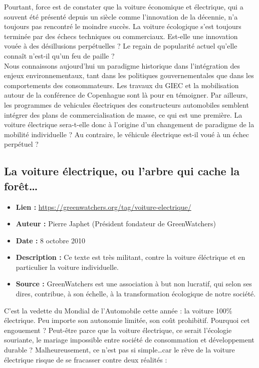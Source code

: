 \documentclass[8pt]{article}
\begin{document}
Pourtant, force est de constater que la voiture économique et électrique, qui a souvent été présenté depuis un siècle comme l’innovation de la décennie, n’a toujours pas rencontré le moindre succès. La voiture écologique s’est toujours terminée par des échecs techniques ou commerciaux. Est-elle une innovation vouée à des désillusions perpétuelles ? Le regain de popularité actuel qu’elle connaît n’est-il qu’un feu de paille ?\\

Nous connaissons aujourd’hui un paradigme historique dans l’intégration des enjeux environnementaux, tant dans les politiques gouvernementales que dans les comportements des consommateurs. Les travaux du GIEC et la mobilisation autour de la conférence de Copenhague sont là pour en témoigner. Par ailleurs, les programmes de vehicules électriques des constructeurs automobiles semblent intégrer des plans de commercialisation de masse, ce qui est une première. La voiture électrique sera-t-elle donc à l’origine d’un changement de paradigme de la mobilité individuelle ? Au contraire, le véhicule électrique est-il voué à un échec perpétuel ?
\newpage

\subsection{La voiture électrique, ou l’arbre qui cache la forêt…}
\begin{itemize}
	\item \textbf{Lien : }  \url{https://greenwatchers.org/tag/voiture-electrique/} 
	\item \textbf{Auteur : } Pierre Japhet (Président fondateur de GreenWatchers)
	\item \textbf{Date : } 8 octobre 2010
	\item \textbf{Description : } Ce texte est très militant, contre la voiture éléctrique et en particulier la voiture individuelle.
	\item \textbf{Source : }  GreenWatchers est une association à but non lucratif, qui selon ses dires, contribue, à  son échelle, à la transformation écologique de notre société. 
\end{itemize}


C’est la vedette du Mondial de l’Automobile cette année : la voiture 100\% électrique. Peu importe son autonomie limitée, son coût prohibitif. Pourquoi cet engouement ? Peut-être parce que la voiture électrique, ce serait l’écologie souriante, le mariage impossible entre société de consommation et développement durable ? Malheureusement, ce n’est pas si simple…car le rêve de la voiture électrique risque de se fracasser contre deux réalités :\\
\end{document}

